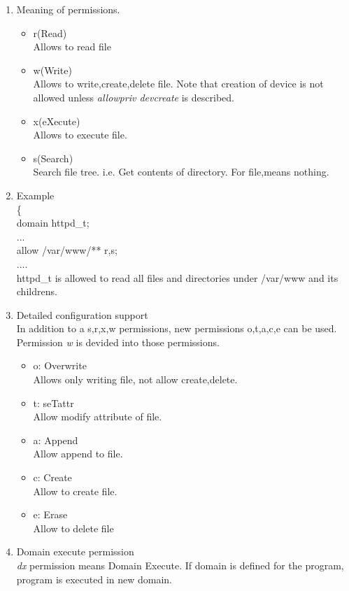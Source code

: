 \documentclass{article}
\begin{document}
\begin{enumerate}
  \item Meaning of permissions.
  \begin{itemize}
   \item r(Read)\\
	 Allows to read file
   \item w(Write)\\
	 Allows to write,create,delete file. Note that creation of
	 device is not allowed unless {\it allowpriv devcreate} is described.
   \item x(eXecute)\\
	 Allows to execute file.
   \item s(Search)\\ 
	 Search file tree. i.e. Get contents of directory. For file,means nothing.
  \end{itemize}
  \item Example\\
	\{\\
	domain httpd\_t;\\
	...\\
	allow /var/www/** r,s;\\
	....\\
	httpd\_t is allowed to read all files and directories under
	/var/www and its childrens.
  \item Detailed configuration support\\
	In addition to a s,r,x,w permissions, new permissions o,t,a,c,e
	can be used. Permission {\it w} is devided into those
	permissions.\\
	\begin{itemize}
	 \item o: Overwrite\\
	       Allows only writing file, not allow create,delete.
	 \item t: seTattr\\
	       Allow modify attribute of file.
	 \item a: Append\\
	       Allow append to file.
	 \item c: Create\\
	       Allow to create file.
	 \item e: Erase\\
	       Allow to delete file  
	\end{itemize}
  \item Domain execute permission\\
	{\it dx} permission means Domain Execute. If domain is defined
	for the program, program is executed in new domain.

\end{enumerate}
\end{document}
